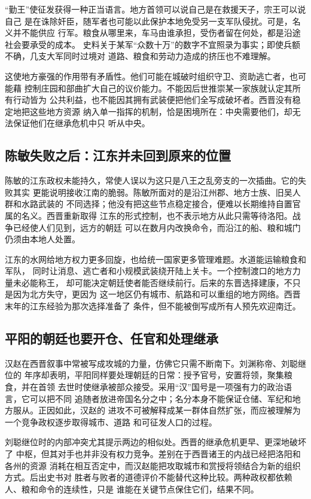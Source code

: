 “勤王”使征发获得一种正当语言。地方首领可以说自己是在救援天子，宗王可以说自己
是在诛除奸臣，随军者也可能以此保护本地免受另一支军队侵扰。可是，名义并不能供应
行军。粮食从哪里来，车马由谁承担，受伤者留在何处，都是沿途社会要承受的成本。
史料关于某军“众数十万”的数字不宜照录为事实；即使兵额不确，几支大军同时过境对
道路、粮食和劳动力造成的挤压也不难理解。

这使地方豪强的作用带有矛盾性。他们可能在城破时组织守卫、资助逃亡者，也可能藉
控制庄园和部曲扩大自己的议价能力。不能因后世推崇某一家族就认定其所有行动皆为
公共利益，也不能因其拥有武装便把他们全写成破坏者。西晋没有稳定地把这些地方资源
纳入单一指挥的机制，恰是困境所在：中央需要他们，却无法保证他们在继承危机中只
听从中央。

\subsection{陈敏失败之后：江东并未回到原来的位置}

陈敏的江东政权未能持久，常使人误以为这只是八王之乱旁支的一次插曲。它的失败其实
更能说明接收江南的脆弱。陈敏所面对的是沿江州郡、地方士族、旧吴人群和水路武装的
不同选择；他没有把这些节点稳定接合，便难以长期维持自置官属的名义。西晋重新取得
江东的形式控制，也不表示地方从此只需等待洛阳。战争已经使人们见到，远方的朝廷
可以在数月内改换命令，而沿江的船、粮和城门仍须由本地人处置。

江东的水网给地方权力更多回旋，也给统一国家更多管理难题。水道能运输粮食和军队，
同时让消息、逃亡者和小规模武装绕开陆上关卡。一个控制渡口的地方力量未必能称王，
却可能决定朝廷使者能否继续前行。后来的东晋选择建康，不只是因为北方失守，更因为
这一地区仍有城市、航路和可以重组的地方网络。西晋末年的江东经验为那次选择准备了
条件，但不能被倒写成所有人预先欢迎南迁。

\subsection{平阳的朝廷也要开仓、任官和处理继承}

汉赵在西晋叙事中常被写成攻城的力量，仿佛它只需不断南下。刘渊称帝、刘聪继位的
年序却表明，平阳同样要处理朝廷的日常：授予官号，安置将领，聚集粮食，并在首领
去世时使继承被部众接受。采用“汉”国号是一项强有力的政治语言，它可以把不同
追随者放进帝国名分之中；名分本身不能保证仓储、军纪和地方服从。正因如此，汉赵的
进攻不可被解释成某一群体自然扩张，而应被理解为一个竞争政权逐步取得城市、道路
和可征发人口的过程。

刘聪继位时的内部冲突尤其提示两边的相似处。西晋的继承危机更早、更深地破坏了
中枢，但其对手也并非没有权力竞争。差别在于西晋诸王的内战已经把洛阳和各州的资源
消耗在相互否定中，而汉赵能把攻取城市和赏授将领结合为新的组织方式。后出史书对
胜者与败者的道德评价不能替代这种比较。两种政权都依赖人、粮和命令的连续性，只是
谁能在关键节点保住它们，结果不同。

